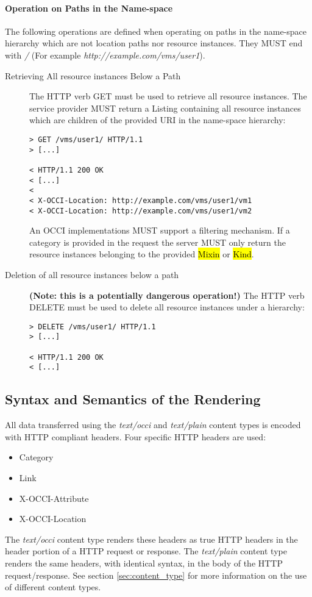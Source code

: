 \documentclass[10pt,a4paper]{article}
\begin{document}
\paragraph{Operation on Paths in the Name-space}
The following operations are defined when operating on paths in the
name-space hierarchy which are not location paths nor resource
instances. They MUST end with \emph{/} (For example
\emph{http://example.com/vms/user1}).

\begin{description}
\item[Retrieving All resource instances Below a Path] The HTTP verb
  GET must be used to retrieve all resource instances. The service
  provider MUST return a Listing containing all resource instances
  which are children of the provided URI in the name-space hierarchy:
\begin{verbatim}
> GET /vms/user1/ HTTP/1.1
> [...]
 
< HTTP/1.1 200 OK
< [...]
< 
< X-OCCI-Location: http://example.com/vms/user1/vm1
< X-OCCI-Location: http://example.com/vms/user1/vm2
\end{verbatim}
An OCCI implementations MUST support a filtering mechanism. If a
category is provided in the request the server MUST only return the
resource instances belonging to the provided \hl{Mixin} or \hl{Kind}.

\item[Deletion of all resource instances below a path] \textbf{(Note:
  this is a potentially dangerous operation!)} The HTTP verb DELETE
  must be used to delete all resource instances under a hierarchy:
\begin{verbatim}
> DELETE /vms/user1/ HTTP/1.1
> [...]
 
< HTTP/1.1 200 OK
< [...]
\end{verbatim}
\end{description}

\subsection{Syntax and Semantics of the Rendering}
\label{sec:syntax}
All data transferred using the \textit{text/occi} and \textit{text/plain}
content types is encoded with HTTP \cite{rfc2616} compliant headers. Four
specific HTTP headers are used:
\begin{itemize}
\item Category
\item Link
\item X-OCCI-Attribute
\item X-OCCI-Location
\end{itemize}
The \textit{text/occi} content type renders these headers as true HTTP headers
in the header portion of a HTTP request or response. The \textit{text/plain}
content type renders the same headers, with identical syntax, in the body of
the HTTP request/response. See section \ref{sec:content_type} for more
information on the use of different content types.
\end{document}
